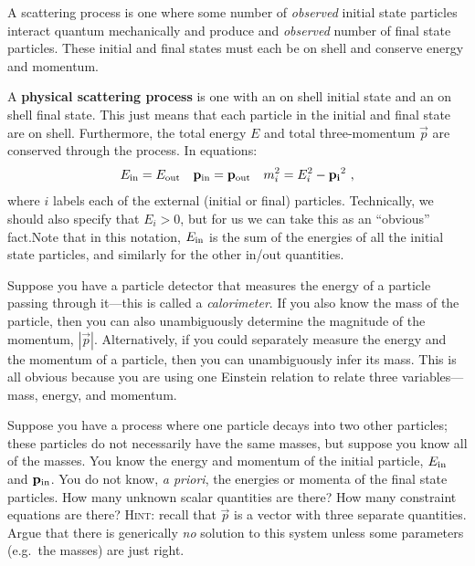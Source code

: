 \documentclass[12pt, oneside]{report}    %
\begin{document}
A scattering process is one where some number of \emph{observed} initial state particles interact quantum mechanically and produce and \emph{observed} number of final state particles. These initial and final states must each be on shell and conserve energy and momentum. 
\begin{newrule}[Kinematics]
A \textbf{physical scattering process} is one with an on shell initial state and an on shell final state. This just means that each particle in the initial and final state are on shell. Furthermore, the total energy $E$ and total three-momentum $\vec{p}$ are conserved through the process. In equations:
\begin{align}
    E_\textnormal{in} &= E_\textnormal{out}
    &
    \vec{p}_\textnormal{in} &= \vec{p}_\textnormal{out}
    &
    m_i^2 = E_i^2 - \vec{p_i}^2 \ ,
\end{align}
where $i$ labels each of the external (initial or final) particles. Technically, we should also specify that $E_i>0$, but for us we can take this as an ``obvious'' fact.\sidenotemark Note that in this notation, $E_\textnormal{in}$ is the sum of the energies of all the initial state particles, and similarly for the other in/out quantities.
\end{newrule}

Suppose you have a particle detector that measures the energy of a particle passing through it---this is called a \emph{calorimeter}. If you also know the mass of the particle, then you can also unambiguously determine the magnitude of the momentum, $|\vec{p}|$.  Alternatively, if you could separately measure the energy and the momentum of a particle, then you can unambiguously infer its mass. This is all obvious because you are using one Einstein relation to relate three variables---mass, energy, and momentum. 

\begin{exercise}
Suppose you have a process where one particle decays into two other particles; these particles do not necessarily have the same masses, but suppose you know all of the masses. You know the energy and momentum of the initial particle, $E_\textnormal{in}$ and $\vec{p}_\textnormal{in}$. You do not know, \emph{a priori}, the energies or momenta of the final state particles. How many unknown scalar quantities are there? How many constraint equations are there? \textsc{Hint}: recall that $\vec{p}$ is a vector with three separate quantities. Argue that there is generically \emph{no} solution to this system unless some parameters (e.g.\ the masses) are just right.
\end{exercise}
\end{document}
